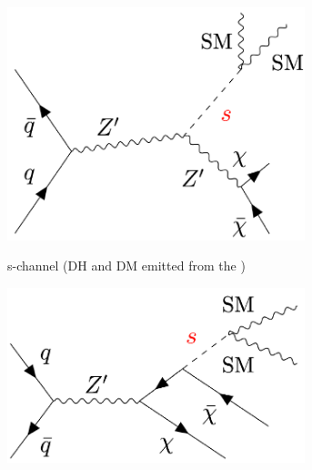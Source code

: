 \begin{figure}[hp]
	\centering
	\begin{subfigure}[t]{0.49\textwidth}
	\centering
	\includegraphics[width=0.95\textwidth]{Figures/2/Fey1.pdf}
	\label{fig:dh_schannel_1}
%
%
%
%
%
%
	\caption{s-channel (DH and DM emitted from the \Zprime)}
	\end{subfigure}
		\begin{subfigure}[t]{0.45\textwidth}
	\centering
	\includegraphics[width=0.95\textwidth]{Figures/2/Fey2.pdf}

\end{subfigure}
\end{figure}
